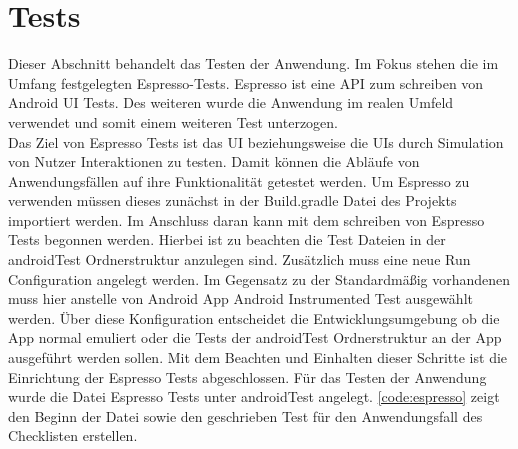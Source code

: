 \section{Tests}\label{sec:tests}
Dieser Abschnitt behandelt das Testen der Anwendung. Im Fokus stehen die im Umfang festgelegten Espresso-Tests. Espresso ist eine \ac{API} zum schreiben von Android \ac{UI} Tests. Des weiteren wurde die Anwendung im realen Umfeld verwendet und somit einem weiteren Test unterzogen.\\
Das Ziel von Espresso Tests ist das \ac{UI} beziehungsweise die \acp{UI} durch Simulation von Nutzer Interaktionen zu testen. Damit können die Abläufe von Anwendungsfällen auf ihre Funktionalität getestet werden. Um Espresso zu verwenden müssen dieses zunächst in der Build.gradle Datei des Projekts importiert werden. Im Anschluss daran kann mit dem schreiben von Espresso Tests begonnen werden. Hierbei ist zu beachten die Test Dateien in der androidTest Ordnerstruktur anzulegen sind. Zusätzlich muss eine neue \glqq Run Configuration\grqq{} angelegt werden. Im Gegensatz zu der Standardmäßig vorhandenen muss hier anstelle von Android App Android Instrumented Test ausgewählt werden. Über diese Konfiguration entscheidet die Entwicklungsumgebung ob die App normal emuliert oder die Tests der androidTest Ordnerstruktur an der App ausgeführt werden sollen. Mit dem Beachten und Einhalten dieser Schritte ist die Einrichtung der Espresso Tests abgeschlossen. Für das Testen der Anwendung wurde die Datei \glqq Espresso Tests\grqq{} unter androidTest angelegt. \autoref{code:espresso} zeigt den Beginn der Datei sowie den geschrieben Test für den Anwendungsfall des Checklisten erstellen.
\\


